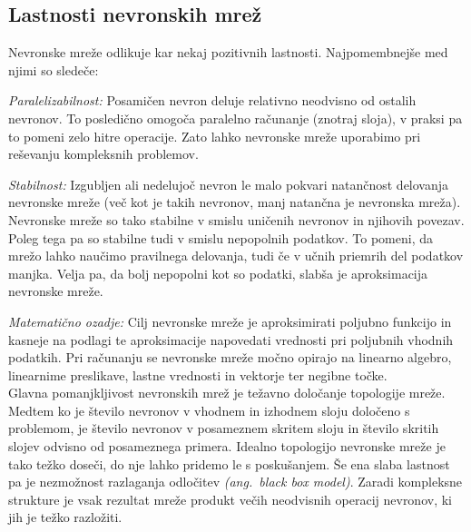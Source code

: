 \documentclass[mat1]{fmfdelo}
\begin{document}
\subsection{Lastnosti nevronskih mrež}
Nevronske mreže odlikuje kar nekaj pozitivnih lastnosti. Najpomembnejše med njimi so sledeče:

\emph{Paralelizabilnost: }Posamičen nevron deluje relativno neodvisno od ostalih nevronov. To posledično omogoča paralelno računanje (znotraj sloja), v praksi pa to pomeni zelo hitre operacije. Zato lahko nevronske mreže uporabimo pri reševanju kompleksnih problemov.

\emph{Stabilnost: }Izgubljen ali nedelujoč nevron le malo pokvari natančnost delovanja nevronske mreže (več kot je takih nevronov, manj natančna je nevronska mreža). Nevronske mreže so tako stabilne v smislu uničenih nevronov in njihovih povezav. Poleg tega pa so stabilne tudi v smislu nepopolnih podatkov. To pomeni, da mrežo lahko naučimo pravilnega delovanja, tudi če v učnih priemrih del podatkov manjka. Velja pa, da bolj nepopolni kot so podatki, slabša je aproksimacija nevronske mreže.

\emph{Matematično ozadje: }Cilj nevronske mreže je aproksimirati poljubno funkcijo in kasneje na podlagi te aproksimacije napovedati vrednosti pri poljubnih vhodnih podatkih. Pri računanju se nevronske mreže močno opirajo na linearno algebro, linearnime preslikave, lastne vrednosti in vektorje ter negibne točke.\\

Glavna pomanjkljivost nevronskih mrež je težavno določanje topologije mreže. Medtem ko je število nevronov v vhodnem in izhodnem sloju določeno s problemom, je število nevronov v posameznem skritem sloju in število skritih slojev odvisno od posameznega primera. Idealno topologijo nevronske mreže je tako težko doseči, do nje lahko pridemo le s poskušanjem. Še ena slaba lastnost pa je nezmožnost razlaganja odločitev \emph{(ang.~black box model)}. Zaradi kompleksne strukture je vsak rezultat mreže produkt večih neodvisnih operacij nevronov, ki jih je težko razložiti.
%
%
\end{document}
